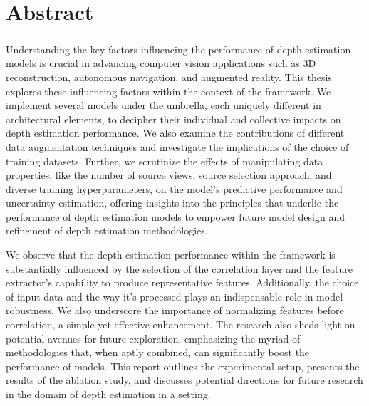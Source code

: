 \chapter*{Abstract}
\paragraph{}Understanding the key factors influencing the performance of depth estimation models is crucial in advancing computer vision applications such as 3D reconstruction, autonomous navigation, and augmented reality. This thesis explores these influencing factors within the context of the \framework {(\rmvd)}\cite{schroeppel2022benchmark} framework. We implement several models under the {\rmvd} umbrella, each uniquely different in architectural elements, to decipher their individual and collective impacts on depth estimation performance. We also examine the contributions of different data augmentation techniques and investigate the implications of the choice of training datasets. Further, we scrutinize the effects of manipulating data properties, like the number of source views, source selection approach, and diverse training hyperparameters, on the model's predictive performance and uncertainty estimation, offering insights into the principles that underlie the performance of {\mv} depth estimation models to empower future model design and refinement of depth estimation methodologies. \par
We observe that the depth estimation performance within the {\rmvd} framework is substantially influenced by the selection of the correlation layer and the feature extractor's capability to produce representative features. Additionally, the choice of input data and the way it's processed plays an indispensable role in model robustness. We also underscore the importance of normalizing features before correlation, a simple yet effective enhancement. The research also sheds light on potential avenues for future exploration, emphasizing the myriad of methodologies that, when aptly combined, can significantly boost the performance of {\mvs} models.
This report outlines the experimental setup, presents the results of the ablation study, and discusses potential directions for future research in the domain of depth estimation in a {\mv} setting. 